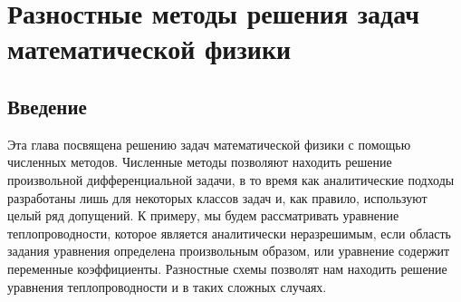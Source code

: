 \documentclass[11pt,a4paper,twoside]{report}
\numberwithin{equation}{section}
\theoremstyle{definition}
\theoremstyle{plain}
\begin{document}
\chapter{Разностные методы решения задач математической физики}
%
%
\section{Введение}
%
Эта глава посвящена решению задач математической физики с помощью численных
методов. Численные методы позволяют находить решение произвольной
дифференциальной задачи, в то время как аналитические подходы разработаны лишь
для некоторых классов задач и, как правило, используют целый ряд
допущений. К примеру, мы будем рассматривать уравнение теплопроводности,
которое является аналитически неразрешимым, если область задания уравнения
определена произвольным образом, или уравнение содержит переменные
коэффициенты. Разностные схемы позволят нам находить решение уравнения
теплопроводности и в таких сложных случаях.
\end{document}
